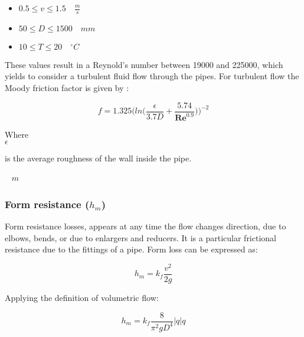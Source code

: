 \begin{itemize}
  \item $0.5 \leq v \leq 1.5  \quad \frac{m}{s}$
  \item $50 \leq D \leq 1500\quad mm$
  \item $10 \leq T \leq 20 \quad ^{\circ} C$
\end{itemize}

These values result in a Reynold's number between 19000 and 225000, which yields to consider a turbulent fluid flow through the pipes. For turbulent flow the 
Moody friction factor is given by \cite{Design_Water}: 

\begin{equation}
  f = 1.325 \bigg(ln\bigg(\frac{\epsilon}{3.7 D}+\frac{5.74}{\pmb{Re}^{0.9}}\bigg)\bigg)^{-2}
  \label{turbulent}
\end{equation}

\begin{minipage}[t]{0.20\textwidth}
Where\\
\hspace*{8mm} $\epsilon$ 
\end{minipage}
\begin{minipage}[t]{0.68\textwidth}
\vspace*{2mm}
is the average roughness of the wall inside the pipe.
 \end{minipage}
\begin{minipage}[t]{0.10\textwidth}
\vspace*{2mm}
\textcolor{White}{te}$\unit{m}$
\end{minipage}

%
\subsubsection{Form resistance (\texorpdfstring{$h_m$}{})} 
\label{FormResistance}

Form resistance losses, appears at any time the flow changes direction, due to elbows, bends,
or due to enlargers and reducers. It is a particular frictional resistance due to the 
fittings of a pipe. Form loss can be expressed as: 

\begin{equation}
  h_m = k_f \frac{v^2}{2g}
\end{equation}


Applying the definition of volumetric flow:

\begin{equation}
   h_m = k_f \frac{8}{\pi^2gD^4}  |q| q
\label{Formloss}
\end{equation}

